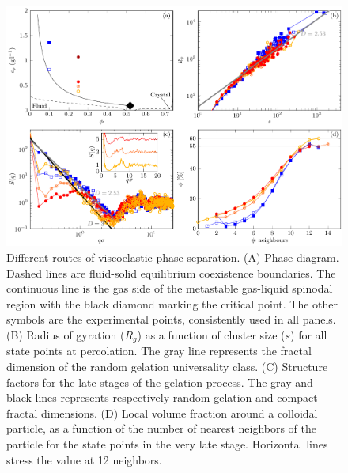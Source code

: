 \documentclass[12pt]{article}
\begin{document}
\clearpage

\begin{figure}[!t]
 \centering
 \includegraphics{phase_separation.pdf}
 \caption{Different routes of viscoelastic phase separation. 
(A) Phase diagram. Dashed lines are fluid-solid equilibrium coexistence boundaries. The continuous line is the gas side of the metastable gas-liquid spinodal region with the black diamond marking the critical point. The other symbols are the experimental points, consistently used in all panels.
(B) Radius of gyration ($R_g$) as a function of cluster size ($s$) for all state points at percolation. The
 gray line represents the fractal dimension of the random gelation universality class.
(C) Structure factors for the late stages of the gelation process. The gray and black lines represents respectively random gelation and compact fractal dimensions.
(D) Local volume fraction around a colloidal particle, as a function of the number of nearest neighbors of the particle for the state points in the very late stage. Horizontal lines stress the value at 12 neighbors.
 }
 \label{fig:phase_separation}
\end{figure}

\clearpage
\end{document}
